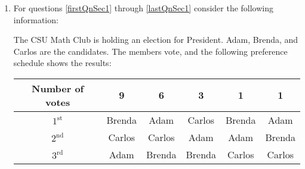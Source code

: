 \documentclass[12pt]{exam}
\begin{document}
\begin{enumerate} 

\item For questions \ref{firstQnSec1} through \ref{lastQnSec1} consider the following information:\par

The CSU Math Club is holding an election for President. Adam, Brenda, and Carlos are the candidates. The members vote, and the following preference schedule shows the results:

\setlength{\tabcolsep}{6pt} %
\renewcommand{\arraystretch}{1}
\setlength\extrarowheight{0pt}
\begin{table}[h]
    \centering
    \begin{tabular}{cccccc}
        \toprule
    Number of votes & 9      & 6      & 3      & 1      & 1      \\
    \midrule
    $1^{\text{st}}$              & Brenda & Adam   & Carlos & Brenda & Adam   \\
    $2^{\text{nd}}$ & Carlos & Carlos & Adam   & Adam   & Brenda \\
    $3^{\text{rd}}$              & Adam   & Brenda & Brenda & Carlos & Carlos\\
    \bottomrule
    \end{tabular}
    \end{table}
    


\end{enumerate}
\end{document}
